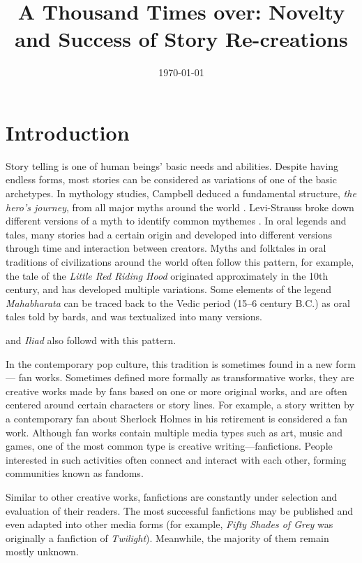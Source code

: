 \documentclass[11pt]{article} %
\begin{document}

\title{A Thousand Times over: Novelty and Success of Story Re-creations} %
\date{\today}
\maketitle %

\section{Introduction} %
\label{sec:introduction}

Story telling is one of human beings' basic needs and abilities\cite{gottschall2012storytelling}. Despite having endless forms, most stories can be considered as variations of one of the basic archetypes. In mythology studies, Campbell deduced a fundamental structure, \emph{the hero's journey}, from all major myths around the world \cite{campbell2008hero}. Levi-Strauss broke down different versions of a myth to identify common mythemes \cite{levi1955structural}. In oral legends and tales, many stories had a certain origin and developed into different versions through time and interaction between creators. Myths and folktales in oral traditions of civilizations around the world often follow this pattern, for example, the tale of the \emph{Little Red Riding Hood} originated approximately in the 10th century, and has developed multiple variations\cite{littlered}. Some elements of the legend \emph{Mahabharata} can be traced back to the Vedic period (15--6 century B.C.) as oral tales told by bards, and was textualized into many versions\cite{van2011mahabharata}.


and \emph{Iliad} also followd with this pattern.

In the contemporary pop culture, this tradition is sometimes found in a new form --- fan works. Sometimes defined more formally as transformative works, they are creative works made by fans based on one or more original works, and are often centered around certain characters or story lines\cite{wiki:transf_work}. For example, a story written by a contemporary fan about Sherlock Holmes in his retirement is considered a fan work. Although fan works contain multiple media types such as art, music and games, one of the most common type is creative writing---fanfictions. People interested in such activities often connect and interact with each other, forming communities known as fandoms\cite{wiki:fandom}.

Similar to other creative works, fanfictions are constantly under selection and evaluation of their readers. The most successful fanfictions may be published and even adapted into other media forms (for example, \emph{Fifty Shades of Grey} was originally a fanfiction of \emph{Twilight}). Meanwhile, the majority of them remain mostly unknown.
\end{document}
